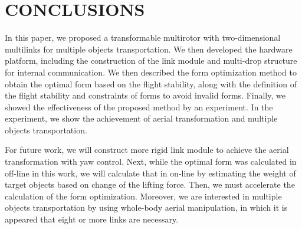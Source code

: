 \section{CONCLUSIONS}
In this paper, we proposed a transformable multirotor with two-dimensional multilinks for multiple objects transportation. We then developed the hardware platform, including the construction of the link module and multi-drop structure for internal communication. We then described the form optimization method to obtain the optimal form based on the flight stability, along with the definition of the flight stability and constraints of forms to avoid invalid forms. Finally, we showed the effectiveness of the proposed method by an experiment. In the experiment, we show the achievement of aerial transformation and multiple objects transportation.
\par
For future work, we will construct more rigid link module to achieve the aerial transformation with yaw control. Next, while the optimal form was calculated in off-line in this work, we will calculate that in on-line by estimating the weight of target objects based on change of the lifting force. Then, we must accelerate the calculation of the form optimization. Moreover, we are interested in multiple objects transportation by using whole-body aerial manipulation\cite{ZhaoICRA2017}, in which it is appeared that eight or more links are necessary.
